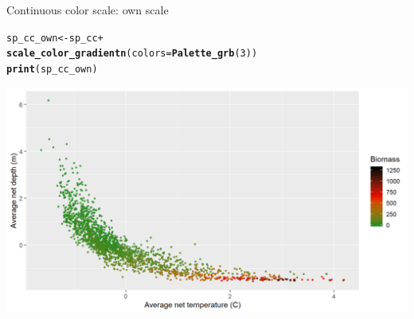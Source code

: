 \documentclass{beamer}\usepackage[]{graphicx}\usepackage[]{color}
\makeatletter
\newcommand{\hlnum}[1]{\textcolor[rgb]{0.686,0.059,0.569}{#1}}%
\newcommand{\hlopt}[1]{\textcolor[rgb]{0,0,0}{#1}}%
\newcommand{\hlstd}[1]{\textcolor[rgb]{0.345,0.345,0.345}{#1}}%
\newcommand{\hlkwb}[1]{\textcolor[rgb]{0.69,0.353,0.396}{#1}}%
\newcommand{\hlkwc}[1]{\textcolor[rgb]{0.333,0.667,0.333}{#1}}%
\newcommand{\hlkwd}[1]{\textcolor[rgb]{0.737,0.353,0.396}{\textbf{#1}}}%
\newenvironment{kframe}{%
 \def\at@end@of@kframe{}%
 \ifinner\ifhmode%
  \def\at@end@of@kframe{\end{minipage}}%
  \begin{minipage}{\columnwidth}%
 \fi\fi%
 \def\FrameCommand##1{\hskip\@totalleftmargin \hskip-\fboxsep
 \colorbox{shadecolor}{##1}\hskip-\fboxsep
     \hskip-\linewidth \hskip-\@totalleftmargin \hskip\columnwidth}%
 \MakeFramed {\advance\hsize-\width
   \@totalleftmargin\z@ \linewidth\hsize
   \@setminipage}}%
 {\par\unskip\endMakeFramed%
 \at@end@of@kframe}
\newenvironment{knitrout}{}{} %
\makeatother
\begin{document}
\begin{frame}[fragile]{Continuous color scale: own scale}
\begin{knitrout}\footnotesize
{}\color{fgcolor}\begin{kframe}
\begin{alltt}
\hlstd{sp_cc_own} \hlkwb{<-} \hlstd{sp_cc} \hlopt{+}
  \hlkwd{scale_color_gradientn}\hlstd{(}\hlkwc{colors} \hlstd{=} \hlkwd{Palette_grb}\hlstd{(}\hlnum{3}\hlstd{))}
\hlkwd{print}\hlstd{(sp_cc_own)}
\end{alltt}
\end{kframe}

{\centering \includegraphics[width=.9\linewidth]{figure/sp_continuous_color7-1} 

}



\end{knitrout}
\end{frame}



\end{document}

